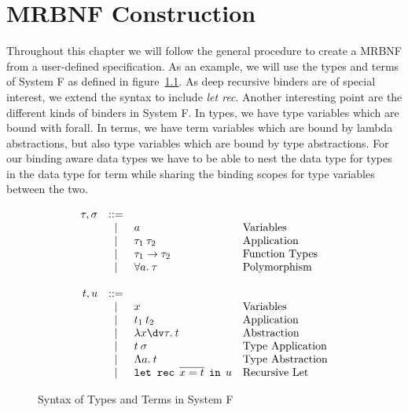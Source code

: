 \chapter{MRBNF Construction}

Throughout this chapter we will follow the general procedure to create a \ac{MRBNF} from a user-defined specification. As an example, we will use the types and terms of System F as defined in figure~\ref{fig:systemf_syntax}. As deep recursive binders are of special interest, we extend the syntax to include \textit{let rec}. Another interesting point are the different kinds of binders in System F. In types, we have type variables which are bound with forall. In terms, we have term variables which are bound by lambda abstractions, but also type variables which are bound by type abstractions. For our binding aware data types we have to be able to nest the data type for types in the data type for term while sharing the binding scopes for type variables between the two.

\begin{figure}[H]
\[
\begin{array}{rcll}
\tau, \sigma & \bnfeq &  & \\ %
& \bnfor & a & \text{Variables} \\
& \bnfor & \tau_1 \: \tau_2 & \text{Application} \\
& \bnfor & \tau_1 \to \tau_2 & \text{Function Types} \\
& \bnfor & \forall a. \: \tau & \text{Polymorphism} \\
& & & \\
t, u & \bnfeq & & \\
& \bnfor & x & \text{Variables} \\
& \bnfor & t_1 \: t_2 & \text{Application} \\
& \bnfor & \lambda x\dv\tau. \: t & \text{Abstraction} \\
& \bnfor & t \: \sigma & \text{Type Application} \\
& \bnfor & \Lambda a . \: t & \text{Type Abstraction} \\
& \bnfor & \texttt{let rec} \:\: \overline{x = t} \:\: \texttt{in} \:\: u & \text{Recursive Let} \\
\end{array}
\]
\caption{Syntax of Types and Terms in System F}
\label{fig:systemf_syntax}
\end{figure}

